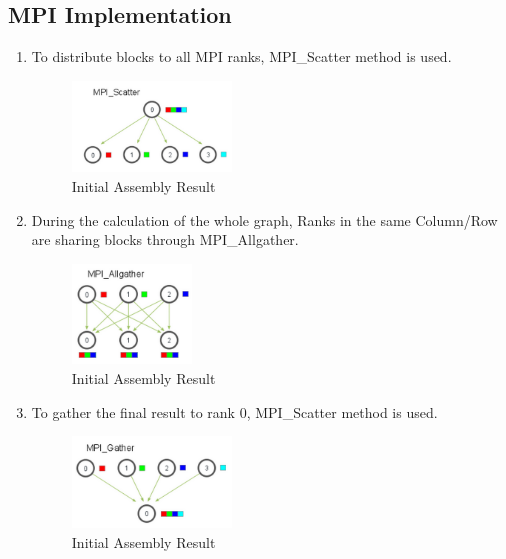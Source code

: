 \vspace{0.5cm}

\subsection{MPI Implementation}
\begin{enumerate}

\item To distribute blocks to all MPI ranks, MPI\_Scatter method is used.
\begin{figure}[H]
    \centering
    \includegraphics[width=0.4\textwidth]{figs/MPI_Scatter.png}
    \caption{Initial Assembly Result}
\end{figure}

\item During the calculation of the whole graph, Ranks in the same Column/Row are sharing blocks through 
	  MPI\_Allgather.
\begin{figure}[H]
    \centering
    \includegraphics[width=0.3\textwidth]{figs/MPI_Allgather.png}
    \caption{Initial Assembly Result}
\end{figure}

\item To gather the final result to rank 0, MPI\_Scatter method is used.
\begin{figure}[H]
    \centering
    \includegraphics[width=0.4\textwidth]{figs/MPI_Gather.png}
    \caption{Initial Assembly Result}
    \label{initial_profile_result_1}
\end{figure}

\end{enumerate}


